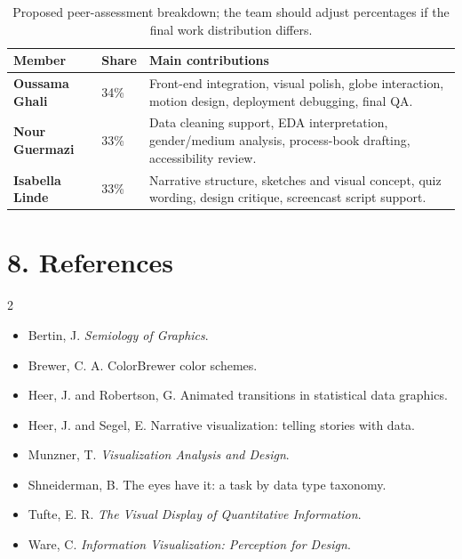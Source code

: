 \documentclass[10pt,a4paper]{article}
\begin{document}
\begin{table}[h]
\centering
\small
\begin{tabularx}{0.95\linewidth}{>{\bfseries}p{3.1cm} p{1.4cm} X}
\toprule
Member & Share & Main contributions \\
\midrule
Oussama Ghali & 34\% & Front-end integration, visual polish, globe interaction, motion design, deployment debugging, final QA. \\
Nour Guermazi & 33\% & Data cleaning support, EDA interpretation, gender/medium analysis, process-book drafting, accessibility review. \\
Isabella Linde & 33\% & Narrative structure, sketches and visual concept, quiz wording, design critique, screencast script support. \\
\bottomrule
\end{tabularx}
\caption{Proposed peer-assessment breakdown; the team should adjust percentages if the final work distribution differs.}
\end{table}

\section*{8. References}
\begin{multicols}{2}
\small
\begin{itemize}
  \item Bertin, J. \textit{Semiology of Graphics}.
  \item Brewer, C. A. ColorBrewer color schemes.
  \item Heer, J. and Robertson, G. Animated transitions in statistical data graphics.
  \item Heer, J. and Segel, E. Narrative visualization: telling stories with data.
  \item Munzner, T. \textit{Visualization Analysis and Design}.
  \item Shneiderman, B. The eyes have it: a task by data type taxonomy.
  \item Tufte, E. R. \textit{The Visual Display of Quantitative Information}.
  \item Ware, C. \textit{Information Visualization: Perception for Design}.
\end{itemize}
\end{multicols}
\end{document}
